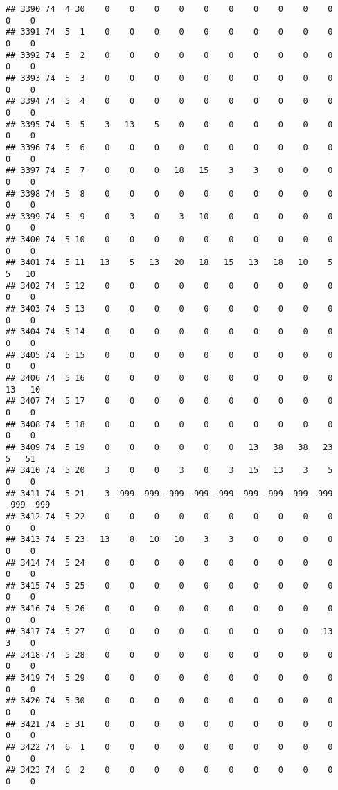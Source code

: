 \documentclass[]{article}
\begin{document}
\begin{verbatim}
## 3390 74  4 30    0    0    0    0    0    0    0    0    0    0    0    0
## 3391 74  5  1    0    0    0    0    0    0    0    0    0    0    0    0
## 3392 74  5  2    0    0    0    0    0    0    0    0    0    0    0    0
## 3393 74  5  3    0    0    0    0    0    0    0    0    0    0    0    0
## 3394 74  5  4    0    0    0    0    0    0    0    0    0    0    0    0
## 3395 74  5  5    3   13    5    0    0    0    0    0    0    0    0    0
## 3396 74  5  6    0    0    0    0    0    0    0    0    0    0    0    0
## 3397 74  5  7    0    0    0   18   15    3    3    0    0    0    0    0
## 3398 74  5  8    0    0    0    0    0    0    0    0    0    0    0    0
## 3399 74  5  9    0    3    0    3   10    0    0    0    0    0    0    0
## 3400 74  5 10    0    0    0    0    0    0    0    0    0    0    0    0
## 3401 74  5 11   13    5   13   20   18   15   13   18   10    5    5   10
## 3402 74  5 12    0    0    0    0    0    0    0    0    0    0    0    0
## 3403 74  5 13    0    0    0    0    0    0    0    0    0    0    0    0
## 3404 74  5 14    0    0    0    0    0    0    0    0    0    0    0    0
## 3405 74  5 15    0    0    0    0    0    0    0    0    0    0    0    0
## 3406 74  5 16    0    0    0    0    0    0    0    0    0    0   13   10
## 3407 74  5 17    0    0    0    0    0    0    0    0    0    0    0    0
## 3408 74  5 18    0    0    0    0    0    0    0    0    0    0    0    0
## 3409 74  5 19    0    0    0    0    0    0   13   38   38   23    5   51
## 3410 74  5 20    3    0    0    3    0    3   15   13    3    5    0    0
## 3411 74  5 21    3 -999 -999 -999 -999 -999 -999 -999 -999 -999 -999 -999
## 3412 74  5 22    0    0    0    0    0    0    0    0    0    0    0    0
## 3413 74  5 23   13    8   10   10    3    3    0    0    0    0    0    0
## 3414 74  5 24    0    0    0    0    0    0    0    0    0    0    0    0
## 3415 74  5 25    0    0    0    0    0    0    0    0    0    0    0    0
## 3416 74  5 26    0    0    0    0    0    0    0    0    0    0    0    0
## 3417 74  5 27    0    0    0    0    0    0    0    0    0   13    3    0
## 3418 74  5 28    0    0    0    0    0    0    0    0    0    0    0    0
## 3419 74  5 29    0    0    0    0    0    0    0    0    0    0    0    0
## 3420 74  5 30    0    0    0    0    0    0    0    0    0    0    0    0
## 3421 74  5 31    0    0    0    0    0    0    0    0    0    0    0    0
## 3422 74  6  1    0    0    0    0    0    0    0    0    0    0    0    0
## 3423 74  6  2    0    0    0    0    0    0    0    0    0    0    0    0

\end{verbatim}
\end{document}
